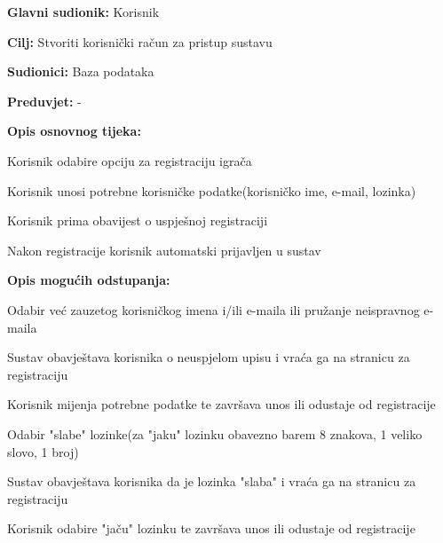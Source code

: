 					
					\noindent {}
					\begin{packed_item}
	
						\item \textbf{Glavni sudionik: }Korisnik
						\item  \textbf{Cilj:} Stvoriti korisnički račun za pristup sustavu
						\item  \textbf{Sudionici:} Baza podataka
						\item  \textbf{Preduvjet:} -
						\item  \textbf{Opis osnovnog tijeka:}
						
						\item[] \begin{packed_enum}
	
							\item Korisnik odabire opciju za registraciju igrača
							\item Korisnik unosi potrebne korisničke podatke(korisničko ime, e-mail, lozinka)
							\item Korisnik prima obavijest o uspješnoj registraciji
							\item Nakon registracije korisnik automatski prijavljen u sustav
						\end{packed_enum}
						
						\item  \textbf{Opis mogućih odstupanja:}
						
						\item[] \begin{packed_item}
	
							\item[2.a] Odabir već zauzetog korisničkog imena i/ili e-maila ili pružanje neispravnog e-maila
							\item[] \begin{packed_enum}
								
								\item Sustav obavještava korisnika o neuspjelom upisu i vraća ga na stranicu za registraciju 
								\item Korisnik mijenja potrebne podatke te završava unos ili odustaje od registracije
								
							\end{packed_enum}
							\item[2.b] Odabir "slabe" lozinke(za "jaku" lozinku obavezno barem 8 znakova, 1 veliko slovo, 1 broj)
							\item[] \begin{packed_enum}
								\item Sustav obavještava korisnika da je lozinka "slaba" i vraća ga na stranicu za registraciju
								\item Korisnik odabire "jaču" lozinku te završava unos ili odustaje od registracije 
								
							\end{packed_enum}
								
						\end{packed_item}
					\end{packed_item}
				
